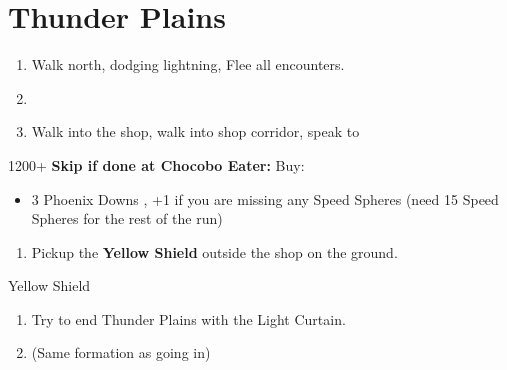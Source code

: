 \chapter{Thunder Plains}

\begin{enumerate}
    \item Walk north, dodging lightning, Flee all encounters.
    \item \save
    \item Walk into the shop, walk into shop corridor, speak to \rikku
\end{enumerate}
\begin{shop}{1200+}
    \textbf{Skip if done at Chocobo Eater: } Buy:
    \begin{itemize}
        \item 3 Phoenix Downs
        , +1 if you are missing any Speed Spheres (need 15 Speed Spheres for the rest of the run)
    \end{itemize}
\end{shop}
\begin{enumerate}[resume]
    \item Pickup the \textbf{Yellow Shield} outside the shop on the ground.
\end{enumerate}
\begin{equip}
    \begin{itemize}
        \tidusf Yellow Shield
    \end{itemize}
\end{equip}
\begin{enumerate}[resume]
    \item Try to end Thunder Plains with the Light Curtain.
    \item \formation{\tidus}{\wakka}{\auron} (Same formation as going in)
\end{enumerate}
